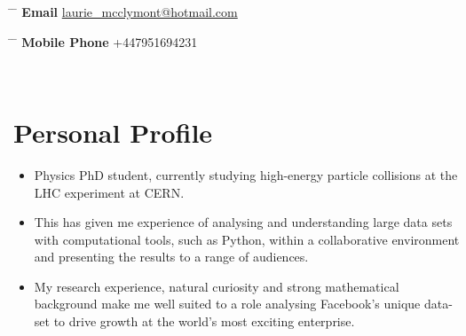 \documentclass[10pt]{article} %
\begin{document}

\title{} %
\vspace{-5mm}


\parbox{0.5\textwidth}{ %
\begin{tabbing} %
\hspace{2cm} \= \hspace{3cm} \= \kill %
{\bf Email} \> \href{mailto:laurie_mcclymont@hotmail.com}{laurie\_mcclymont@hotmail.com} \\ %
\end{tabbing}}
\hspace{2cm} %
\parbox{0.5\textwidth}{ %
\begin{tabbing} %
\hspace{3cm} \= \hspace{4cm} \= \kill %
{\bf Mobile Phone} \> +447951694231 \\ %
\end{tabbing}}
\vspace{-10mm}\\ %


\section{Personal Profile}
\begin{itemize}
\item{Physics PhD student, currently studying high-energy particle collisions at the LHC experiment at CERN.}
\item{This has given me experience of analysing and understanding large data sets with computational tools, such as Python, within
  a collaborative environment and presenting the results to a range of audiences.}
\item{My research experience, natural curiosity and strong mathematical background make me well suited to a role analysing
  Facebook's unique data-set to drive growth at the world's most exciting enterprise.}


\end{itemize}
\end{document}
